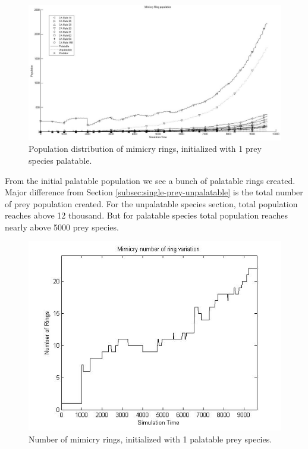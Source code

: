 \begin{figure}[H]
	\centering
	\includegraphics[scale=0.40]{images/simTime9k-1-p}
	\caption{Population distribution of mimicry rings, initialized with 1 prey species palatable.}
	\label{fig:plot-1-prey-p}
\end{figure}

From the initial palatable population we see a bunch of palatable rings created. Major difference from Section \ref{subsec:single-prey-unpalatable} is the total number of prey population created. For the unpalatable species section, total population reaches above 12 thousand. But for palatable species total population reaches nearly above 5000 prey species.

\begin{figure}[H]
	\centering
	\includegraphics[scale=0.50]{images/ringSize8k-1Prey-p}
	\caption{Number of mimicry rings, initialized with 1 palatable prey species.}
	\label{fig:ringSize8k-1-Prey-p}
\end{figure}

